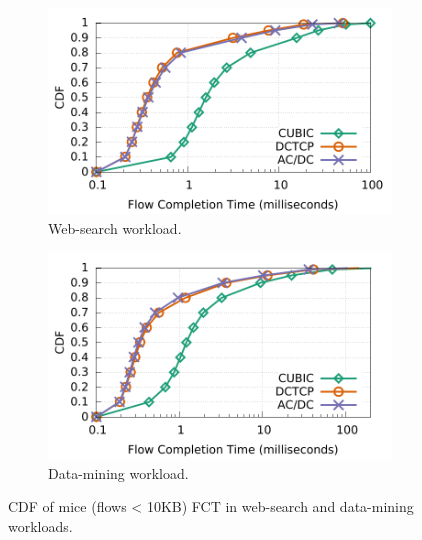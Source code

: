 \begin{figure}[!t]
        \centering
        \begin{subfigure}[b]{0.45\textwidth}
                \centering
                \includegraphics[width=\textwidth]{figures/macro_benchmarks/trace-driven/trace_driven_workload_dctcp_senders5_10points.pdf}
                \caption{Web-search workload.}
                \label{trace-driven-searching-fct}
        \end{subfigure}
        \begin{subfigure}[b]{0.45\textwidth}
                \centering
                \includegraphics[width=\textwidth]{figures/macro_benchmarks/trace-driven/trace_driven_workload_conga_senders5_10points.pdf}
                \caption{Data-mining workload.}
                \label{trace-driven-data-mining-fct}
        \end{subfigure}
        \caption{CDF of mice (flows < 10KB) FCT in web-search and data-mining workloads.}
        \label{macro-trace-driven-fct}
\end{figure}

